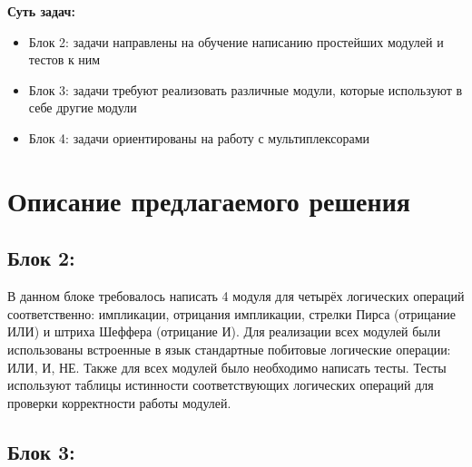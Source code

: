 \documentclass[a4paper]{article}
\begin{document}
\textbf{Суть задач:}
\begin{itemize} [leftmargin=3.5em, topsep=0pt]
	\item Блок 2: задачи направлены на обучение написанию простейших модулей и тестов к ним

	\item Блок 3: задачи требуют реализовать различные модули, которые используют в себе другие модули

	\item Блок 4: задачи ориентированы на работу с мультиплексорами
\end{itemize}

\section{Описание предлагаемого решения}

\subsection{Блок 2:}

В данном блоке требовалось написать 4 модуля для четырёх логических операций соответственно: импликации, отрицания импликации, стрелки Пирса (отрицание ИЛИ) и штриха Шеффера (отрицание И). Для реализации всех модулей были использованы встроенные в язык стандартные побитовые логические операции: ИЛИ, И, НЕ. Также для всех модулей было необходимо написать тесты. Тесты используют таблицы истинности соответствующих логических операций для проверки корректности работы модулей.

\subsection{Блок 3:}
\end{document}
